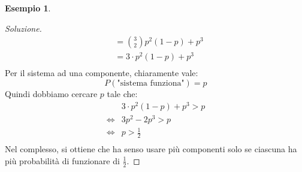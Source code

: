 \documentclass{article}
\theoremstyle{plain}
\theoremstyle{definition}
\newtheorem{esempio}{Esempio}[section]
\theoremstyle{remark}
\newenvironment{soluzione}
	{\renewcommand\qedsymbol{$\mathwitch*$}\begin{proof}[Soluzione]}
	{\end{proof}}
\renewcommand{\qedsymbol}{$\mathrightghost$}
\begin{document}
\begin{esempio}
\begin{soluzione}
\begin{align*}
			&=\binom{3}{2}p^2 (1-p)+p^3\\
			&=3\cdot p^2 (1-p)+p^3\\
		\end{align*}
		Per il sistema ad una componente, chiaramente vale:
		\begin{equation*}
			P(\text{"sistema funziona"})=p
		\end{equation*}
		Quindi dobbiamo cercare $p$ tale che:
		\begin{align*}
			&3\cdot p^2 (1-p)+p^3>p\\
			\Leftrightarrow&3p^2-2p^3>p\\
			\Leftrightarrow&p>\frac{1}{2}\\
		\end{align*}
		Nel complesso, si ottiene che ha senso usare più componenti solo se ciascuna ha più probabilità di funzionare di $\frac{1}{2}$.
	\end{soluzione}
\end{esempio}
\end{document}
